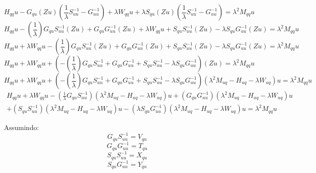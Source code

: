 \documentclass[a4paper,12p]{article}
\begin{document}
	\begin{equation}
	H_{qq}u - G_{qu}(Zu)(\frac{1}{\lambda} S_{uu}^{-1} - G_{uu}^{-1}) + \lambda W_{qq}u + \lambda S_{qu}(Zu)(\frac{1}{\lambda} S_{uu}^{-1} - G_{uu}^{-1}) = \lambda^2 M_{qq}u
	\end{equation}
	\begin{equation}
	H_{qq}u 
	- (\frac{1}{\lambda})G_{qu}S_{uu}^{-1}(Zu)
	+ G_{qu}G_{uu}^{-1}(Zu)
	+ \lambda W_{qq}u 
	+ S_{qu}S_{uu}^{-1}(Zu) 
	- \lambda S_{qu}G_{uu}^{-1}(Zu) 
	= \lambda^2 M_{qq}u
	\end{equation}
	\begin{equation}
	H_{qq}u 
	+ \lambda W_{qq}u 
	- (\frac{1}{\lambda})G_{qu}S_{uu}^{-1}(Zu)
	+ G_{qu}G_{uu}^{-1}(Zu)
	+ S_{qu}S_{uu}^{-1}(Zu) 
	- \lambda S_{qu}G_{uu}^{-1}(Zu) 
	= \lambda^2 M_{qq}u
	\end{equation}
	\begin{equation}
	H_{qq}u 
	+ \lambda W_{qq}u 
	+( - (\frac{1}{\lambda})G_{qu}S_{uu}^{-1}
	+ G_{qu}G_{uu}^{-1}
	+ S_{qu}S_{uu}^{-1}
	- \lambda S_{qu}G_{uu}^{-1})(Zu) 
	= \lambda^2 M_{qq}u
	\end{equation}
	\begin{equation}
	H_{qq}u 
	+ \lambda W_{qq}u 
	+( - (\frac{1}{\lambda})G_{qu}S_{uu}^{-1}
	+ G_{qu}G_{uu}^{-1}
	+ S_{qu}S_{uu}^{-1}
	- \lambda S_{qu}G_{uu}^{-1})
	(\lambda^2 M_{uq} - H_{uq}  - \lambda W_{uq})u 
	= \lambda^2 M_{qq}u
	\end{equation}
	\begin{equation}
	\begin{split}
	H_{qq}u 
	+ \lambda W_{qq}u 
	- (\frac{1}{\lambda}G_{qu}S_{uu}^{-1})
	(\lambda^2 M_{uq} - H_{uq}  - \lambda W_{uq})u
	+ (G_{qu}G_{uu}^{-1})
	(\lambda^2 M_{uq} - H_{uq}  - \lambda W_{uq})u \\
	+ (S_{qu}S_{uu}^{-1})
	(\lambda^2 M_{uq} - H_{uq}  - \lambda W_{uq})u
	- (\lambda S_{qu}G_{uu}^{-1})
	(\lambda^2 M_{uq} - H_{uq}  - \lambda W_{uq})u 
	= \lambda^2 M_{qq}u
	\end{split}
	\end{equation}
	
	Assumindo:
	\begin{equation}
	G_{qu}S_{uu}^{-1} = V_{qu}
	\end{equation}
	\begin{equation}
	G_{qu}G_{uu}^{-1} = T_{qu}
	\end{equation}
	\begin{equation}
	S_{qu}S_{uu}^{-1} = X_{qu}
	\end{equation}
	\begin{equation}
	S_{qu}G_{uu}^{-1} = Y_{qu}
	\end{equation}
	
\end{document}

